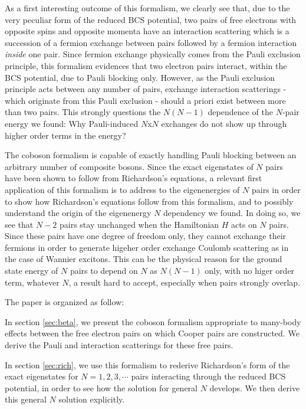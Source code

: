 \documentclass[epj]{svjour}
\begin{document}
As a first interesting outcome of this formalism, we clearly see that, due to the very peculiar form of the reduced BCS potential, two pairs of free electrons with opposite spins and opposite momenta have an interaction scattering which is a succession of a fermion exchange between pairs followed by a fermion interaction \textit{inside} one pair. Since fermion exchange physically comes from the Pauli exclusion principle, this formalism evidences that two electron pairs interact, within the BCS potential, due to Pauli blocking only. However, as the Pauli exclusion principle acts between any number of pairs, exchange interaction scatterings - which originate from this Pauli exclusion - should a priori exist between more than two pairs. This strongly questions the $N(N-1)$ dependence of the $N$-pair energy we found: Why Pauli-induced $N$x$N$ exchanges do not show up through higher order terms in the energy?

The coboson formalism is capable of exactly handling Pauli blocking between an arbitrary number of composite bosons. Since the exact eigenstates of $N$ pairs have been shown to follow from Richardson's equations, a relevant first application of this formalism  is to address to the eigenenergies of $N$ pairs in order to show how  Richardson's equations follow from this formalism, and to possibly understand the origin of the eigenenergy $N$ dependency we found. In doing so, we see that $N-2$ pairs stay unchanged when the Hamiltonian $H$ acts on $N$ pairs. Since these pairs have one degree of freedom only, they cannot exchange their fermions in order to generate higeher order exchange Coulomb scattering as in the case of Wannier excitons. This can be the physical reason for the ground state energy of $N$ pairs to depend on $N$ as $N(N-1)$ only, with no higer order term, whatever $N$, a result hard to accept, especially when pairs strongly overlap.


The paper is organized as follow:

In section \ref{sec:beta}, we present the coboson formalism appropriate to many-body effects between the free
electron pairs on which Cooper pairs are constructed. We derive the Pauli and interaction scatterings for these free pairs.

In section 
\ref{sec:rich}, we use this formalism to rederive Richardson's form of the
exact eigenstates for $N=1,2,3,\cdots$ pairs interacting through the reduced
BCS potential, in order to see how the solution for general $N$ develops. We then derive this general $N$ solution explicitly.
\end{document}
